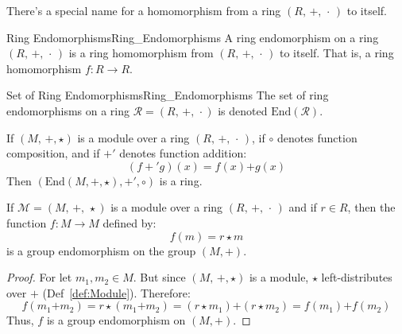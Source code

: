     There's a special name for a homomorphism from a ring
    $(R,\,+,\,\cdot\,)$ to itself.
    \begin{fdefinition}{Ring Endomorphisms}{Ring_Endomorphisms}
        A \gls{ring endomorphism} on a \gls{ring} $(R,\,+,\,\cdot\,)$ is a
        \gls{ring homomorphism} from $(R,\,+,\,\cdot\,)$ to itself. That is,
        a ring homomorphism $f:R\rightarrow{R}$.
    \end{fdefinition}
    \begin{fnotation}{Set of Ring Endomorphisms}{Ring_Endomorphisms}
        The set of ring endomorphisms on a ring $\mathcal{R}=(R,\,+,\,\cdot)$
        is denoted $\textrm{End}(\mathcal{R})$.
    \end{fnotation}
    \begin{theorem}
        If $(M,\,\boldsymbol{+},\star)$ is a module over a ring
        $(R,\,+,\,\cdot\,)$, if $\circ$ denotes function composition,
        and if $\boldsymbol{+}'$ denotes function addition:
        \begin{equation}
            (f+'g)(x)=f(x)\boldsymbol{+}g(x)
        \end{equation}
        Then $(\textrm{End}(M,\boldsymbol{+},\star),\boldsymbol{+}',\circ)$
        is a ring.
    \end{theorem}
    \begin{theorem}
        \label{thm:Scalar_Mult_in_Module_Defines_Group_Endo}%
        If $\mathcal{M}=(M,\,\boldsymbol{+},\,\star)$ is a module over a ring
        $(R,\,+,\,\cdot\,)$ and if $r\in{R}$, then the function
        $f:M\rightarrow{M}$ defined by:
        \begin{equation}
            f(m)=r\star{m}
        \end{equation}
        is a group endomorphism on the group $(M,\boldsymbol{+})$.
    \end{theorem}
    \begin{proof}
        For let $m_{1},m_{2}\in{M}$. But since $(M,\,\boldsymbol{+},\star)$
        is a module, $\star$ left-distributes over $\boldsymbol{+}$
        (Def~\ref{def:Module}). Therefore:
        \begin{equation}
            f(m_{1}\boldsymbol{+}m_{2})
            =r\star(m_{1}\boldsymbol{+}m_{2})
            =(r\star{m}_{1})\boldsymbol{+}(r\star{m}_{2})
            =f(m_{1})\boldsymbol{+}f(m_{2})
        \end{equation}
        Thus, $f$ is a group endomorphism on $(M,\boldsymbol{+})$.
    \end{proof}
